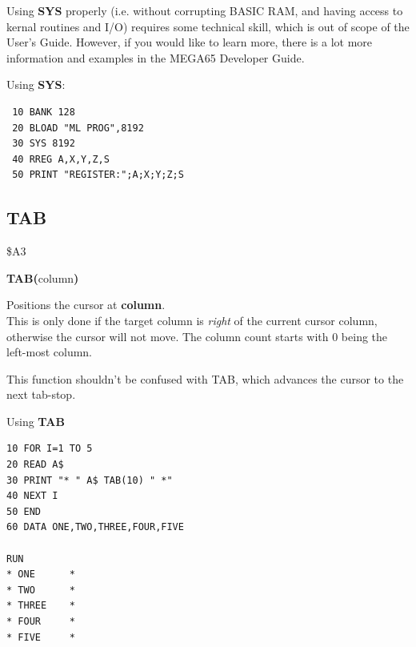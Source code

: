 \begin{description}[leftmargin=2cm,style=nextline]
                 Using {\bf SYS} properly (i.e. without corrupting BASIC RAM, and having
                 access to kernal routines and I/O) requires
                 some technical skill, which is out of scope of the User's Guide.
                 However, if you would like to learn more, there is a lot more
                 information and examples in the MEGA65 Developer Guide.

\item [Example:] Using {\bf SYS}:
\begin{tcolorbox}[colback=black,coltext=white]
\verbatimfont{\codefont}
\begin{verbatim}
 10 BANK 128
 20 BLOAD "ML PROG",8192
 30 SYS 8192
 40 RREG A,X,Y,Z,S
 50 PRINT "REGISTER:";A;X;Y;Z;S
\end{verbatim}
\end{tcolorbox}

\end{description}


\newpage
\subsection{TAB}
\begin{description}[leftmargin=2cm,style=nextline]
\item [Token:] \$A3
\item [Format:] {\bf TAB(}column{\bf)}
\item [Usage:] Positions the cursor at {\bf column}. \\
               This is only done if the target column is {\it right}
               of the current cursor column, otherwise the cursor
               will not move. The column count starts with 0 being the
               left-most column.

\item [Remarks:] This function shouldn't be confused with
               {\specialkey TAB}, which advances the cursor to the next
               tab-stop.

\item [Example:] Using {\bf TAB}
\begin{tcolorbox}[colback=black,coltext=white]
\verbatimfont{\codefont}
\begin{verbatim}
10 FOR I=1 TO 5
20 READ A$
30 PRINT "* " A$ TAB(10) " *"
40 NEXT I
50 END
60 DATA ONE,TWO,THREE,FOUR,FIVE

RUN
* ONE      *
* TWO      *
* THREE    *
* FOUR     *
* FIVE     *
\end{verbatim}
\end{tcolorbox}
\end{description}

